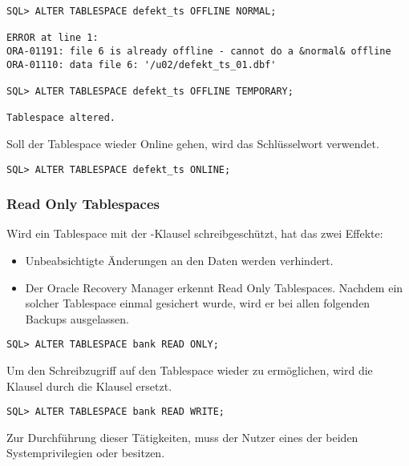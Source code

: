           \begin{lstlisting}[language=oracle_sql,alsolanguage=sqlplus]
SQL> ALTER TABLESPACE defekt_ts OFFLINE NORMAL;

ERROR at line 1:
ORA-01191: file 6 is already offline - cannot do a &normal& offline
ORA-01110: data file 6: '/u02/defekt_ts_01.dbf'

SQL> ALTER TABLESPACE defekt_ts OFFLINE TEMPORARY;

Tablespace altered.
          \end{lstlisting}
          Soll der Tablespace wieder Online gehen, wird das Schlüsselwort  verwendet.
          \begin{lstlisting}[caption={Einen Tablespace online setzen},label=admin113,language=oracle_sql]
SQL> ALTER TABLESPACE defekt_ts ONLINE;
          \end{lstlisting}
        \subsubsection{Read Only Tablespaces}
          Wird ein Tablespace mit der -Klausel
          schreibgeschützt, hat das zwei Effekte:
          \begin{itemize}
            \item Unbeabsichtigte Änderungen an den Daten werden verhindert.
            \item Der Oracle Recovery Manager erkennt Read Only Tablespaces. Nachdem ein solcher Tablespace einmal gesichert wurde, wird er bei allen folgenden Backups ausgelassen.
          \end{itemize}
          \begin{lstlisting}[caption={Einen Tablespace Read Only setzen},label=admin114,language=oracle_sql]
SQL> ALTER TABLESPACE bank READ ONLY;
          \end{lstlisting}
          Um den Schreibzugriff auf den Tablespace wieder zu ermöglichen, wird die Klausel  durch die Klausel  ersetzt.
          \begin{lstlisting}[caption={Einen Tablespace Read Write setzen},label=admin115,language=oracle_sql]
SQL> ALTER TABLESPACE bank READ WRITE;
          \end{lstlisting}
          Zur Durchführung dieser Tätigkeiten, muss der Nutzer eines der beiden Systemprivilegien  oder  besitzen.
